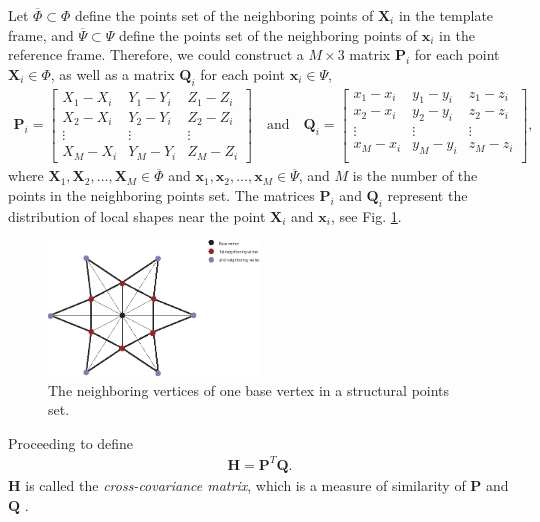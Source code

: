 \documentclass{llncs}
\begin{document}
Let $\overline{\Phi} \subset \Phi$ define the points set of the neighboring points of $\mathbf{X}_i$ in the template frame, and $\overline{\Psi} \subset \Psi$ define the points set of the neighboring points of $\mathbf{x}_i$ in the reference frame. Therefore, we could construct a $M \times 3$ matrix $\mathbf{P}_i$ for each point $\mathbf{X}_i \in \Phi$, as well as a matrix $\mathbf{Q}_i$ for each point $\mathbf{x}_i \in \Psi$,
\begin{align}
\mathbf{P}_i=
  \begin{bmatrix}
    X_1-X_i & Y_1-Y_i & Z_1-Z_i  \\
    X_2-X_i & Y_2-Y_i & Z_2-Z_i  \\
    \vdots & \vdots & \vdots \\
    X_M-X_i & Y_M-Y_i & Z_M-Z_i 
  \end{bmatrix} 
\quad \mbox{and} \quad 
 \mathbf{Q}_i=
  \begin{bmatrix}
    x_1-x_i & y_1-y_i & z_1-z_i  \\
    x_2-x_i & y_2-y_i & z_2-z_i  \\
    \vdots & \vdots & \vdots \\
    x_M-x_i & y_M-y_i & z_M-z_i  \\
  \end{bmatrix},
\end{align}
where $\mathbf{X}_1,\mathbf{X}_2,\dots,\mathbf{X}_M \in \overline{\Phi}$ and $\mathbf{x}_1,\mathbf{x}_2,\dots,\mathbf{x}_M \in \overline{\Psi}$, and $M$ is the number of the points in the neighboring points set. The matrices $\mathbf{P}_i$ and $\mathbf{Q}_i$ represent the distribution of local shapes near the point $\mathbf{X}_i$ and $\mathbf{x}_i$, see Fig. \ref{fig:neighboring_point}.
\begin{figure}
 \centering
 \includegraphics[width=0.5\textwidth]{image//neighboring_point.eps}
 \caption{The neighboring vertices of one base vertex in a structural points set.}
 \label{fig:neighboring_point}
\end{figure}  

Proceeding to define
\begin{align}
\mathbf{H} = \mathbf{P}^T \mathbf{Q}.
\end{align}
$\mathbf{H}$ is called the \emph{cross-covariance matrix}, which is a measure of similarity of $\mathbf{P}$ and $\mathbf{Q}$ \cite{park2017fundamentals}. 
\end{document}

